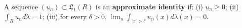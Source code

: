 A sequence $(u_n) \subset \mathfrak{L}_1(R)$ is an \textbf{approximate identity} if: (i) $u_n \geq 0$; (ii) $\int_R u_n d\lambda = 1$; (iii) for every $\delta > 0$, $\lim_n \int_{|x| > \delta} u_n(x) d\lambda(x) = 0$.
